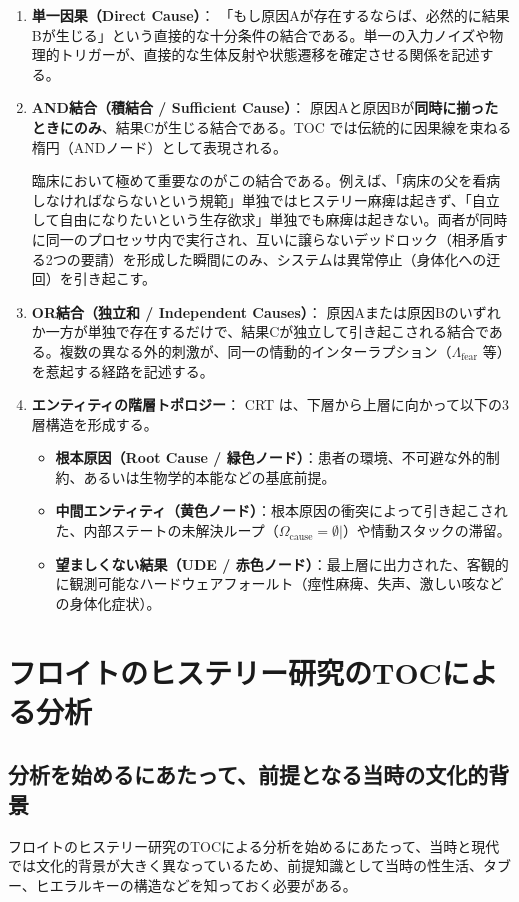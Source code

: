 \begin{enumerate}
    \item \textbf{単一因果（Direct Cause）}：
    「もし原因Aが存在するならば、必然的に結果Bが生じる」という直接的な十分条件の結合である。単一の入力ノイズや物理的トリガーが、直接的な生体反射や状態遷移を確定させる関係を記述する。
    
    \item \textbf{AND結合（積結合 / Sufficient Cause）}：
    原因Aと原因Bが\textbf{同時に揃ったときにのみ}、結果Cが生じる結合である。TOC では伝統的に因果線を束ねる楕円（ANDノード）として表現される。
    
    臨床において極めて重要なのがこの結合である。例えば、「病床の父を看病しなければならないという規範」単独ではヒステリー麻痺は起きず、「自立して自由になりたいという生存欲求」単独でも麻痺は起きない。両者が同時に同一のプロセッサ内で実行され、互いに譲らないデッドロック（相矛盾する2つの要請）を形成した瞬間にのみ、システムは異常停止（身体化への迂回）を引き起こす。
    
    \item \textbf{OR結合（独立和 / Independent Causes）}：
    原因Aまたは原因Bのいずれか一方が単独で存在するだけで、結果Cが独立して引き起こされる結合である。複数の異なる外的刺激が、同一の情動的インターラプション（$\Lambda_{\mathrm{fear}}$ 等）を惹起する経路を記述する。
    
    \item \textbf{エンティティの階層トポロジー}：
    CRT は、下層から上層に向かって以下の3層構造を形成する。
    \begin{itemize}
        \item \textbf{根本原因（Root Cause / 緑色ノード）}：患者の環境、不可避な外的制約、あるいは生物学的本能などの基底前提。
        \item \textbf{中間エンティティ（黄色ノード）}：根本原因の衝突によって引き起こされた、内部ステートの未解決ループ（$\Omega_{\mathrm{cause}} = \emptyset |$）や情動スタックの滞留。
        \item \textbf{望ましくない結果（UDE / 赤色ノード）}：最上層に出力された、客観的に観測可能なハードウェアフォールト（痙性麻痺、失声、激しい咳などの身体化症状）。
    \end{itemize}
\end{enumerate}
\section{フロイトのヒステリー研究のTOCによる分析}
\subsection{分析を始めるにあたって、前提となる当時の文化的背景}
フロイトのヒステリー研究のTOCによる分析を始めるにあたって、当時と現代では文化的背景が大きく異なっているため、前提知識として当時の性生活、タブー、ヒエラルキーの構造などを知っておく必要がある。

